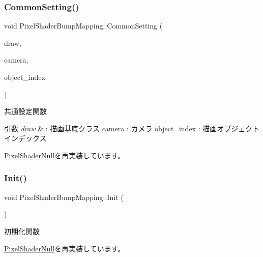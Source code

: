\subsubsection{\texorpdfstring{Common\+Setting()}{CommonSetting()}}
{\footnotesize\ttfamily void Pixel\+Shader\+Bump\+Mapping\+::\+Common\+Setting (\begin{DoxyParamCaption}\item[{\mbox{\hyperlink{class_draw_base}{Draw\+Base}} $\ast$}]{draw,  }\item[{\mbox{\hyperlink{class_camera}{Camera}} $\ast$}]{camera,  }\item[{unsigned}]{object\+\_\+index }\end{DoxyParamCaption})\hspace{0.3cm}{\ttfamily [virtual]}}



共通設定関数 


\begin{DoxyParams}{引数}
{\em draw} & \+: 描画基底クラス camera \+: カメラ object\+\_\+index \+: 描画オブジェクトインデックス \\
\hline
\end{DoxyParams}


\mbox{\hyperlink{class_pixel_shader_null_a99c712ab174da29ba26a893820b64799}{Pixel\+Shader\+Null}}を再実装しています。

\mbox{\label{class_pixel_shader_bump_mapping_ab7807b7c56242e965ddb23e66e1a5d9e}} 
\subsubsection{\texorpdfstring{Init()}{Init()}}
{\footnotesize\ttfamily void Pixel\+Shader\+Bump\+Mapping\+::\+Init (\begin{DoxyParamCaption}{ }\end{DoxyParamCaption})\hspace{0.3cm}{\ttfamily [virtual]}}



初期化関数 



\mbox{\hyperlink{class_pixel_shader_null_abfd7a6a986da09061a55d31024219eba}{Pixel\+Shader\+Null}}を再実装しています。

\mbox{\label{class_pixel_shader_bump_mapping_afa80c2404b490a444d54cc47c681ca8f}} 
